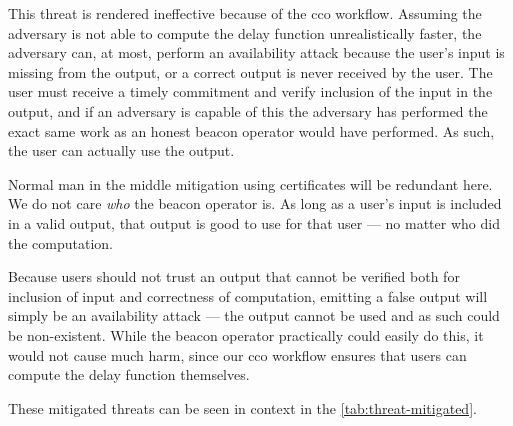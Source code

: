 This threat is rendered ineffective because of the \gls{cco} workflow. Assuming the adversary is not able to compute the delay function unrealistically faster, the adversary can, at most, perform an availability attack because the user's input is missing from the output, or a correct output is never received by the user. The user must receive a timely commitment and verify inclusion of the input in the output, and if an adversary is capable of this the adversary has performed the exact same work as an honest beacon operator would have performed. As such, the user can actually use the output.

Normal man in the middle mitigation using certificates will be redundant here. We do not care \emph{who} the beacon operator is. As long as a user's input is included in a valid output, that output is good to use for that user --- no matter who did the computation.

Because users should not trust an output that cannot be verified both for inclusion of input and correctness of computation, emitting a false output will simply be an availability attack --- the output cannot be used and as such could be non-existent. While the beacon operator practically could easily do this, it would not cause much harm, since our \gls{cco} workflow ensures that users can compute the delay function themselves.


\bigskip
These mitigated threats can be seen in context in the \cref{tab:threat-mitigated}.


